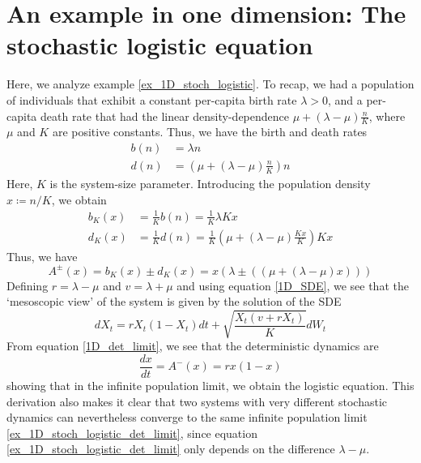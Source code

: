 \section{An example in one dimension: The stochastic logistic equation}
Here, we analyze example \ref{ex_1D_stoch_logistic}. To recap, we had a population of individuals that exhibit a constant per-capita birth rate $\lambda > 0$, and a per-capita death rate that had the linear density-dependence $\mu + (\lambda-\mu)\frac{n}{K}$, where $\mu$ and $K$ are positive constants. Thus, we have the birth and death rates
\begin{equation}
\label{ex_1D_stoch_logistic_BD_eqns}
\begin{aligned}
    b(n) &= \lambda n\\
    d(n) &= \left(\mu + (\lambda-\mu)\frac{n}{K}\right)n
\end{aligned}
\end{equation}
Here, $K$ is the system-size parameter. Introducing the population density $x\coloneqq n/K$, we obtain
\begin{align*}
    b_K(x) &= \frac{1}{K}b(n) = \frac{1}{K}\lambda Kx\\
    d_K(x) &= \frac{1}{K}d(n) = \frac{1}{K}\left(\mu + (\lambda-\mu)\frac{Kx}{K}\right)Kx
\end{align*}
Thus, we have
\begin{equation*}
    A^{\pm}(x) = b_K(x)\pm d_K(x) = x\left(\lambda \pm \left(\left(\mu + (\lambda-\mu)x\right)\right) \right)
\end{equation*}
Defining $r=\lambda-\mu$ and $v=\lambda+\mu$ and using equation \eqref{1D_SDE}, we 
see that the `mesoscopic view' of the system is given by the solution of the SDE
\begin{equation}\label{ex_1D_stoch_logistic_full_SDE}
dX_t =  rX_t(1-X_t)dt + \sqrt{\frac{X_t(v+rX_t)}{K}}dW_t
\end{equation}
From equation \eqref{1D_det_limit}, we see that the deterministic dynamics are
\begin{equation}\label{ex_1D_stoch_logistic_det_limit}
\frac{dx}{dt} = A^-(x) = rx(1-x)
\end{equation}
showing that in the infinite population limit, we obtain the logistic equation. This derivation also makes it clear that two systems with very different stochastic dynamics can nevertheless converge to the same infinite population limit \eqref{ex_1D_stoch_logistic_det_limit}, since equation \eqref{ex_1D_stoch_logistic_det_limit} only depends on the difference $\lambda-\mu$.
